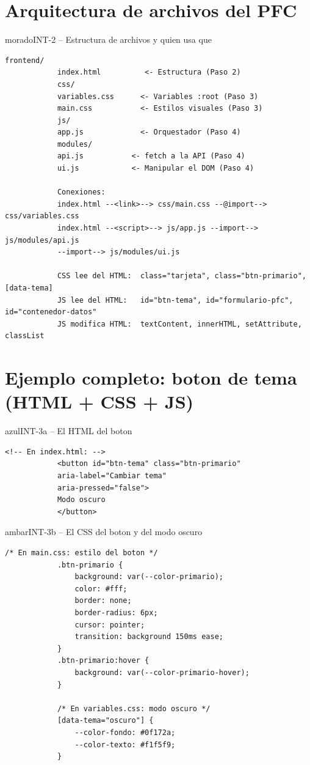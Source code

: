 \documentclass[11pt,a4paper]{article}
\begin{document}
	\section{Arquitectura de archivos del PFC}
	
	\begin{cajacodigo}{morado}{INT-2 -- Estructura de archivos y quien usa que}
		\begin{lstlisting}[style=codebash]
			frontend/
			index.html          <- Estructura (Paso 2)
			css/
			variables.css      <- Variables :root (Paso 3)
			main.css           <- Estilos visuales (Paso 3)
			js/
			app.js             <- Orquestador (Paso 4)
			modules/
			api.js           <- fetch a la API (Paso 4)
			ui.js            <- Manipular el DOM (Paso 4)
			
			Conexiones:
			index.html --<link>--> css/main.css --@import--> css/variables.css
			index.html --<script>--> js/app.js --import--> js/modules/api.js
			--import--> js/modules/ui.js
			
			CSS lee del HTML:  class="tarjeta", class="btn-primario", [data-tema]
			JS lee del HTML:   id="btn-tema", id="formulario-pfc", id="contenedor-datos"
			JS modifica HTML:  textContent, innerHTML, setAttribute, classList
		\end{lstlisting}
	\end{cajacodigo}
	
	\section{Ejemplo completo: boton de tema (HTML + CSS + JS)}
	
	\begin{cajacodigo}{azul}{INT-3a -- El HTML del boton}
		\begin{lstlisting}[style=codehtml]
			<!-- En index.html: -->
			<button id="btn-tema" class="btn-primario"
			aria-label="Cambiar tema"
			aria-pressed="false">
			Modo oscuro
			</button>
		\end{lstlisting}
	\end{cajacodigo}
	
	\begin{cajacodigo}{ambar}{INT-3b -- El CSS del boton y del modo oscuro}
		\begin{lstlisting}[style=codecss]
			/* En main.css: estilo del boton */
			.btn-primario {
				background: var(--color-primario);
				color: #fff;
				border: none;
				border-radius: 6px;
				cursor: pointer;
				transition: background 150ms ease;
			}
			.btn-primario:hover {
				background: var(--color-primario-hover);
			}
			
			/* En variables.css: modo oscuro */
			[data-tema="oscuro"] {
				--color-fondo: #0f172a;
				--color-texto: #f1f5f9;
			}
		\end{lstlisting}
	\end{cajacodigo}
	
\end{document}
